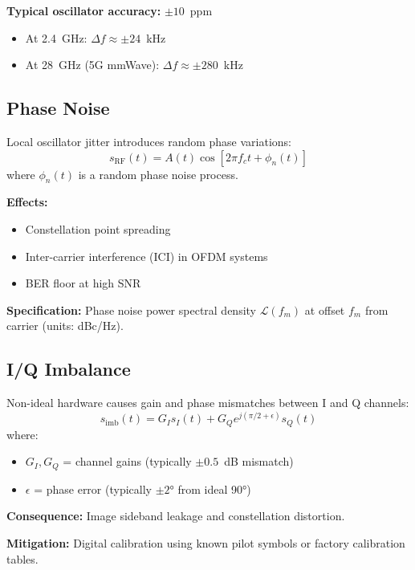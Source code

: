 \textbf{Typical oscillator accuracy:} $\pm 10$~ppm
\begin{itemize}
\item At 2.4~GHz: $\Delta f \approx \pm 24$~kHz
\item At 28~GHz (5G mmWave): $\Delta f \approx \pm 280$~kHz
\end{itemize}

\subsection{Phase Noise}

Local oscillator jitter introduces random phase variations:
\begin{equation}
s_{\text{RF}}(t) = A(t)\cos[2\pi f_c t + \phi_n(t)]
\end{equation}
where $\phi_n(t)$ is a random phase noise process.

\textbf{Effects:}
\begin{itemize}
\item Constellation point spreading
\item Inter-carrier interference (ICI) in OFDM systems
\item BER floor at high SNR
\end{itemize}

\textbf{Specification:} Phase noise power spectral density $\mathcal{L}(f_m)$ at offset $f_m$ from carrier (units: dBc/Hz).

\subsection{I/Q Imbalance}

Non-ideal hardware causes gain and phase mismatches between I and Q channels:
\begin{equation}
s_{\text{imb}}(t) = G_I s_I(t) + G_Q e^{j(\pi/2 + \epsilon)} s_Q(t)
\end{equation}
where:
\begin{itemize}
\item $G_I, G_Q$ = channel gains (typically $\pm 0.5$~dB mismatch)
\item $\epsilon$ = phase error (typically $\pm 2°$ from ideal 90°)
\end{itemize}

\textbf{Consequence:} Image sideband leakage and constellation distortion.

\textbf{Mitigation:} Digital calibration using known pilot symbols or factory calibration tables.

